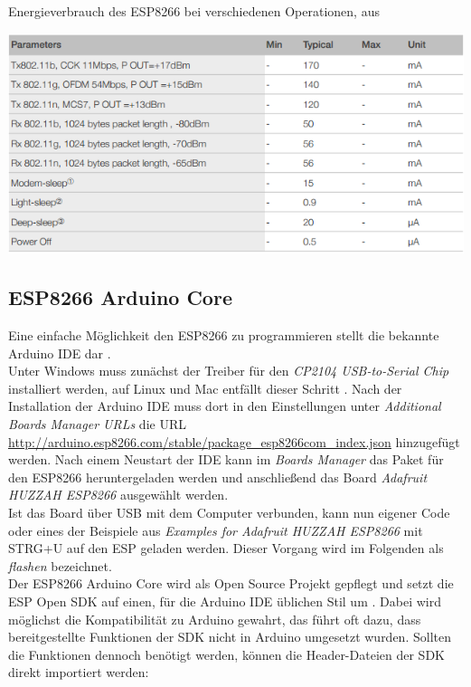 \begin{table}[h]
  \centering
  \caption{Energieverbrauch des ESP8266 bei verschiedenen Operationen, aus \cite{espressif2017esp8266}}
	\includegraphics[width=\textwidth]{images/esppower.png}

  \label{table:esppower}
\end{table}


\subsection{ESP8266 Arduino Core}
Eine einfache Möglichkeit den ESP8266 zu programmieren stellt die bekannte Arduino IDE dar \cite{banzi2017arduino}.\\
Unter Windows muss zunächst der Treiber für den \textit{CP2104 USB-to-Serial Chip} installiert werden, auf Linux und Mac entfällt dieser Schritt \cite{fried2017feather}.
Nach der Installation der Arduino IDE muss dort in den Einstellungen unter \textit{Additional Boards Manager URLs} die URL \url{http://arduino.esp8266.com/stable/package_esp8266com_index.json} hinzugefügt werden.  
Nach einem Neustart der IDE kann im \textit{Boards Manager} das Paket für den ESP8266 heruntergeladen werden und anschließend das Board \textit{Adafruit HUZZAH ESP8266} ausgewählt werden. \\
Ist das Board über USB mit dem Computer verbunden, kann nun eigener Code oder eines der Beispiele aus \textit{Examples for Adafruit HUZZAH ESP8266} mit STRG+U auf den ESP geladen werden. 
Dieser Vorgang wird im Folgenden als \emph{flashen} bezeichnet. \\
Der ESP8266 Arduino Core wird als Open Source Projekt gepflegt und setzt die ESP Open SDK auf einen, für die Arduino IDE üblichen Stil um \cite{arduino2017core}. 
Dabei wird möglichst die Kompatibilität zu Arduino gewahrt, das führt oft dazu, dass bereitgestellte Funktionen der SDK nicht in Arduino umgesetzt wurden.
Sollten die Funktionen dennoch benötigt werden, können die Header-Dateien der SDK direkt importiert werden:

